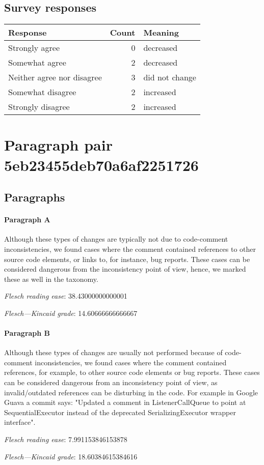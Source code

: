 \subsection{Survey responses}
\begin{tabular}{lrl}
\toprule
          \textbf{Response} &  \textbf{Count} & \textbf{Meaning} \\
\midrule
             Strongly agree &               0 &        decreased \\
             Somewhat agree &               2 &        decreased \\
 Neither agree nor disagree &               3 &   did not change \\
          Somewhat disagree &               2 &        increased \\
          Strongly disagree &               2 &        increased \\
\bottomrule
\end{tabular}

\section{Paragraph pair 5eb23455deb70a6af2251726}
\subsection{Paragraphs}
\paragraph{Paragraph A}
Although these types of changes are typically not due to code-comment inconsistencies, we found cases where the comment contained references to other source code elements, or links to, for instance, bug reports. These cases can be considered dangerous from the inconsistency point of view, hence, we marked these as well in the taxonomy.\par\medskip\emph{Flesch reading ease}: 38.43000000000001\par\emph{Flesch---Kincaid grade}: 14.60666666666667

\paragraph{Paragraph B}
Although these types of changes are usually not performed because of code-comment inconsistencies, we found cases where the comment contained references, for example, to other source code elements or bug reports. These cases can be considered dangerous from an inconsistency point of view, as invalid/outdated references can be disturbing in the code. For example in Google Guava a commit says: "Updated a comment in ListenerCallQueue to point at SequentialExecutor instead of the deprecated SerializingExecutor wrapper interface".\par\medskip\emph{Flesch reading ease}: 7.991153846153878\par\emph{Flesch---Kincaid grade}: 18.60384615384616

